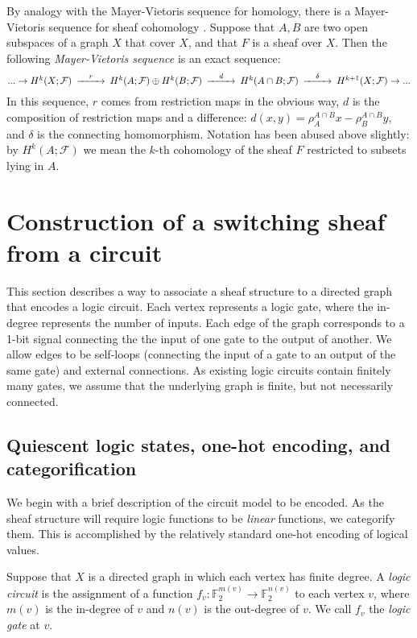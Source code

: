 \documentclass{amsart}
\theoremstyle{plain}
\theoremstyle{definition}
\begin{document}
By analogy with the Mayer-Vietoris sequence for homology, there is a
Mayer-Vietoris sequence for sheaf cohomology \cite{Bredon}.  Suppose
that $A,B$ are two open subspaces of a graph $X$ that cover $X$, and
that $F$ is a sheaf over $X$.  Then the following {\it Mayer-Vietoris
  sequence} is an exact sequence:
\begin{equation*}
\begin{CD}
...\to H^k(X;\mathcal{F})@>r>>H^k(A;\mathcal{F})\oplus H^k(B;\mathcal{F})@>d>>H^k(A \cap B;\mathcal{F})@>\delta>>H^{k+1}(X;\mathcal{F})\to...
\end{CD}
\end{equation*}
In this sequence, $r$ comes from restriction maps in the obvious way,
$d$ is the composition of restriction maps and a difference: $d(x,y)=
\rho_A^{A\cap B} x - \rho_B^{A\cap B} y$, and $\delta$ is the
connecting homomorphism.  Notation has been abused above
slightly: by $H^k(A;\mathcal{F})$ we mean the $k$-th cohomology of the sheaf $F$
restricted to subsets lying in $A$.

\section{Construction of a switching sheaf from a circuit}
\label{def_sec}

This section describes a way to associate a sheaf structure to a directed graph that encodes a logic circuit.  Each vertex represents a logic gate, where the in-degree represents the number of inputs.  Each edge of the graph corresponds to a 1-bit signal connecting the the input of one gate to the output of another.  We allow edges to be self-loops (connecting the input of a gate to an output of the same gate) and external connections.  As existing logic circuits contain finitely many gates, we assume that the underlying graph is finite, but not necessarily connected.

\subsection{Quiescent logic states, one-hot encoding, and categorification}
We begin with a brief description of the circuit model to be encoded.
As the sheaf structure will require logic functions to be {\it linear}
functions, we categorify them.  This is accomplished by the relatively
standard one-hot encoding of logical values.

Suppose that $X$ is a directed graph in which each vertex has finite
degree.  A {\it logic circuit} is the assignment of a function
$f_v:\mathbb{F}_2^{m(v)} \to \mathbb{F}_2^{n(v)}$ to each vertex $v$, 
 where $m(v)$ is the in-degree of $v$ and $n(v)$ is the out-degree of
 $v$.  We call $f_v$ the {\it logic gate} at $v$.
\end{document}
